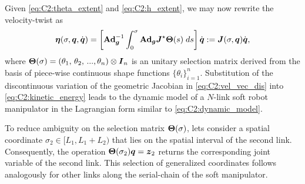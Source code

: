 Given \eqref{eq:C2:theta_extent} and \eqref{eq:C2:h_extent}, we may now rewrite the velocity-twist as
%
\begin{equation} {\boldsymbol{\eta}}(\sigma,{\boldsymbol{q}},{\dot{\boldsymbol{q}}}) = \left[\textbf{Ad}_{{\boldsymbol{g}}}^{-1}
\int_0^\sigma \textbf{Ad}_{{\boldsymbol{g}}} {\boldsymbol{J}}^\star {\boldsymbol{\Theta}}(s) \; ds \right]{\dot{\boldsymbol{q}}} := {\boldsymbol{J}}(\sigma,{\boldsymbol{q}}) {\dot{\boldsymbol{q}}},
\label{eq:C2:vel_vec_dis} \end{equation}
%
where ${\boldsymbol{\Theta}}(\sigma) = (\theta_1,\,\theta_2,\,...,\theta_n) \otimes \boldsymbol{I}_n$ is an unitary selection matrix derived from the basis of piece-wise continuous shape functions $\!\{\theta_i\}_{i=1}^n$. Substitution of the discontinuous variation of the geometric Jacobian in \eqref{eq:C2:vel_vec_dis} into
\eqref{eq:C2:kinetic_energy} leads to the dynamic model of a $N$-link soft robot manipulator in the
Lagrangian form similar to \eqref{eq:C2:dynamic_model}.
%
\begin{example}
To reduce ambiguity on the selection matrix ${\boldsymbol{\Theta}}(\sigma)$, lets consider a spatial coordinate $\sigma_2 \in [L_1,L_1+L_2)$ that lies on the spatial interval of the second link. Consequently, the operation ${\boldsymbol{\Theta}}(\sigma_2) {\boldsymbol{q}} = \boldsymbol{z}_2$ returns the corresponding joint variable of the second link. This selection of generalized coordinates follows analogously for other links along the serial-chain of the soft manipulator.
\end{example}
%
